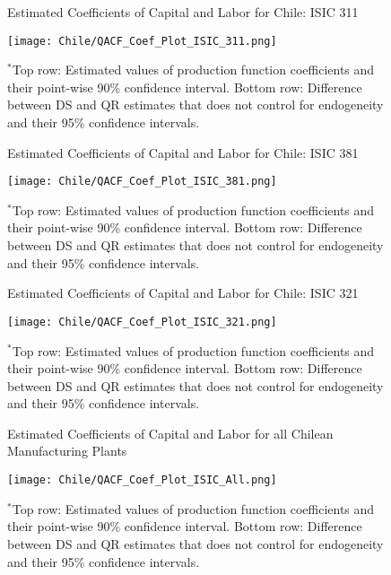 \documentclass[12pt]{article}
\begin{document}
\begin{figure}[H]
\centering
\caption{Estimated Coefficients of Capital and Labor for Chile: ISIC 311}
\texttt{[image: Chile/QACF\_Coef\_Plot\_ISIC\_311.png]}
\caption*{\footnotesize $^{*}$Top row: Estimated values of production function coefficients and their point-wise 90\% confidence interval. Bottom row: Difference between DS and QR estimates that does not control for endogeneity and their 95\% confidence intervals.}
\label{fig:QACFCHL311}
\end{figure}

\begin{figure}[H]
\centering
\caption{Estimated Coefficients of Capital and Labor for Chile: ISIC 381}
\texttt{[image: Chile/QACF\_Coef\_Plot\_ISIC\_381.png]}
\caption*{\footnotesize $^{*}$Top row: Estimated values of production function coefficients and their point-wise 90\% confidence interval. Bottom row: Difference between DS and QR estimates that does not control for endogeneity and their 95\% confidence intervals.}
\label{fig:QACFCHL381}
\end{figure}

\begin{figure}[H]
\centering
\caption{Estimated Coefficients of Capital and Labor for Chile: ISIC 321}
\texttt{[image: Chile/QACF\_Coef\_Plot\_ISIC\_321.png]}
\caption*{\footnotesize $^{*}$Top row: Estimated values of production function coefficients and their point-wise 90\% confidence interval. Bottom row: Difference between DS and QR estimates that does not control for endogeneity and their 95\% confidence intervals.}
\label{fig:QACFCHL321}
\end{figure}

\begin{figure}[H]
\centering
\caption{Estimated Coefficients of Capital and Labor for all Chilean Manufacturing Plants}
\texttt{[image: Chile/QACF\_Coef\_Plot\_ISIC\_All.png]}
\caption*{\footnotesize $^{*}$Top row: Estimated values of production function coefficients and their point-wise 90\% confidence interval. Bottom row: Difference between DS and QR estimates that does not control for endogeneity and their 95\% confidence intervals.}
\label{fig:QACFCHLall}
\end{figure}
\end{document}
